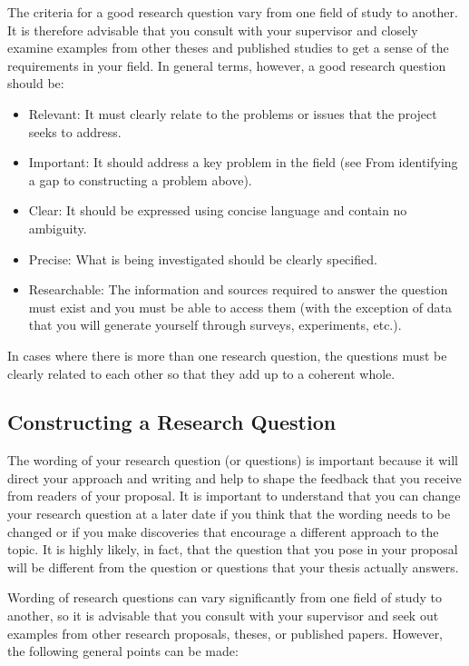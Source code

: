 \documentclass[12pt, a4paper]{article}
\begin{document}
The criteria for a good research question vary from one field of study to another. It is therefore advisable that you consult with your supervisor and closely examine examples from other theses and published studies to get a sense of the requirements in your field. In general terms, however, a good research question should be:
\begin{itemize}
\item Relevant: It must clearly relate to the problems or issues that the project seeks to address.
\item Important: It should address a key problem in the field (see From identifying a gap to constructing a problem above).  
\item Clear: It should be expressed using concise language and contain no ambiguity.
\item Precise: What is being investigated should be clearly specified.
\item Researchable: The information and sources required to answer the question must exist and you must be able to access them (with the exception of data that you will generate yourself through surveys, experiments, etc.).
\end{itemize}

In cases where there is more than one research question, the questions must be clearly related to each other so that they add up to a coherent whole.

\subsection{Constructing a Research Question}
The wording of your research question (or questions) is important because it will direct your approach and writing and help to shape the feedback that you receive from readers of your proposal. It is important to understand that you can change your research question at a later date if you think that the wording needs to be changed or if you make discoveries that encourage a different approach to the topic. It is highly likely, in fact, that the question that you pose in your proposal will be different from the question or questions that your thesis actually answers.

Wording of research questions can vary significantly from one field of study to another, so it is advisable that you consult with your supervisor and seek out examples from other research proposals, theses, or published papers. However, the following general points can be made:
\end{document}
